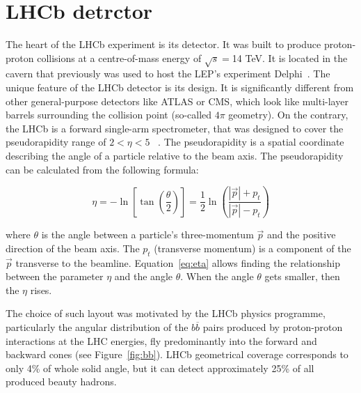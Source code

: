 \section{LHCb detrctor}

The heart of the LHCb experiment is its detector. It was built to produce proton-proton collisions at a centre-of-mass energy of $\sqrt{s}=$14 TeV. It is located in the cavern that previously was used to host the LEP's experiment Delphi~\cite{deplhi}. The unique feature of the LHCb detector is its design. It is significantly different from other general-purpose detectors like ATLAS or CMS, which look like multi-layer barrels surrounding the collision point (so-called $4 \pi$ geometry).
On the contrary, the LHCb is a forward single-arm spectrometer, that was designed to cover the pseudorapidity range of $2< \eta < 5 $ ~\cite{lhcb}. The pseudorapidity is a spatial coordinate describing the angle of a particle relative to the beam axis. The  pseudorapidity can be calculated from the following formula: 

\begin{equation}
    \eta = - \ln\left[ \tan \left( \frac{\theta }{2}\right) \right]\nonumber = \frac{1}{2} \ln \left( \frac{|\vec{p}|+ p_t}{|\vec{p}|- p_t}  \right)
    \label{eq:eta}
\end{equation}

where $\theta$  is the angle between a particle's three-momentum $\vec{p}$ and the positive direction of the beam axis. The $p_t$ (transverse momentum) is a component of the $\vec{p}$ transverse to the beamline.
Equation~\ref{eq:eta} allows finding the relationship between the parameter $\eta$ and the angle $\theta$. When the angle $\theta$ gets smaller, then the $\eta$ rises.


The choice of such layout was motivated by the LHCb physics programme, particularly the angular distribution of the $b \overline{b}$ pairs produced by proton-proton interactions at the LHC energies, fly predominantly into the forward and backward cones (see Figure~\ref{fig:bb}). LHCb geometrical coverage corresponds to only 4\% of whole solid angle, but it can detect approximately 25\% of all produced beauty hadrons. 

